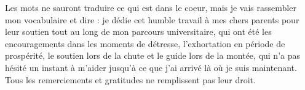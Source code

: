 \documentclass[a4paper, 12pt]{report}
\begin{document}

Les mots ne sauront traduire ce qui est dans le coeur, mais je vais rassembler mon
vocabulaire et dire : je dédie cet humble travail à mes chers parents pour leur soutien tout
au long de mon parcours universitaire, qui ont été les encouragements dans les moments
de détresse, l'exhortation en période de prospérité, le soutien lors de la chute et le guide
lors de la montée, qui n'a pas hésité un instant à m'aider jusqu'à ce que j'ai arrivé là où je
suis maintenant. Tous les remerciements et gratitudes ne remplissent pas leur droit.
\vspace{8mm}
\begin{flushright}
\end{flushright}
		\thispagestyle{empty} 
\end{document}

